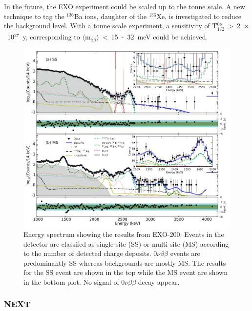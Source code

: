 \documentclass[main.tex]{subfiles}
\begin{document}
\bigskip


\NI In the future, the EXO experiment could be scaled up to the tonne scale. A new technique to tag the $^{\text{136}}$Ba ions, daughter of the $^{\text{136}}$Xe, is investigated to reduce the background level. With a tonne scale experiment, a sensitivity of T$_{\text{1/2}}^{0\nu}$~>~2~$\times$~10$^{\text{27}}$~y, corresponding to $\langle \text{m}_{\beta\beta} \rangle$~<~15~-~32~meV could be achieved.


\begin{figure}[h!]
\begin{center}
\includegraphics[scale=0.4]{pictures/Chap2/EXO-200-experiment.png}
\caption{Energy spectrum showing the results from EXO-200. Events in the detector are classifed as single-site (SS) or multi-site (MS) according to the number of detected charge deposits. 0$\nu\beta\beta$ events are predominantly SS whereas backgrounds are mostly MS. The results for the SS event are shown in the top while the MS event are shown in the bottom plot. No signal of 0$\nu\beta\beta$ decay appear.}
\label{EXO200results}
\end{center}
\end{figure}


\FloatBarrier


\subsubsection{NEXT}
\end{document}
